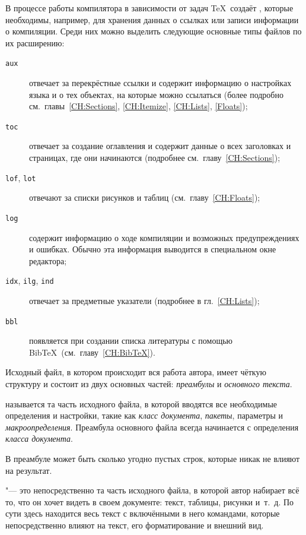 В процессе работы компилятора в зависимости от задач \TeX\ создаёт , которые необходимы, например, для хранения данных о ссылках или записи информации о компиляции. Среди них можно выделить следующие основные типы файлов по их расширению:
\begin{description}
\item[\texttt{aux}] отвечает за перекрёстные ссылки и содержит информацию о настройках языка и о тех объектах, на которые можно ссылаться (более подробно см.\ главы~\ref{CH:Sections}, \ref{CH:Itemize}, \ref{CH:Lists}, \ref{Floats});
\item[\texttt{toc}] отвечает за создание оглавления и содержит данные о всех заголовках и страницах, где они начинаются (подробнее см.\ главу~\ref{CH:Sections});
\item[\texttt{lof}, \texttt{lot}] отвечают за списки рисунков и таблиц (см.\ главу~\ref{CH:Floats});
\item[\texttt{log}] содержит информацию о ходе компиляции и возможных предупреждениях и ошибках. Обычно эта информация выводится в специальном окне редактора;
\item[\texttt{idx}, \texttt{ilg}, \texttt{ind}] отвечает за предметные указатели (подробнее в гл.~\ref{CH:Lists});
\item[\texttt{bbl}] появляется при создании списка литературы с помощью Bib\TeX\ (см.\ главу~\ref{CH:BibTeX}).
\end{description}

Исходный файл, в котором происходит вся работа автора, имеет чёткую структуру и состоит из двух основных частей: \emph{преамбулы} и \emph{основного текста}.

 называется та часть исходного файла, в которой вводятся все необходимые определения и настройки, такие как \emph{класс документа}, \textit{пакеты}, параметры и \textit{макроопределения}. Преамбула основного файла всегда начинается с определения \emph{класса документа}.

\begin{note}
В преамбуле может быть сколько угодно пустых строк, которые никак не влияют на результат.
\end{note}

 "--- это непосредственно та часть исходного файла, в которой автор набирает всё то, что он хочет видеть в своем документе: текст, таблицы, рисунки и~т.~д. По сути здесь находится весь текст с включёнными в него командами, которые непосредственно влияют на текст, его форматирование и внешний вид.

